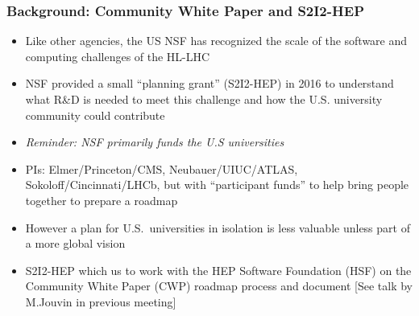 \begin{frame}
\frametitle{Background: Community White Paper and S2I2-HEP}

\begin{itemize}
\item Like other agencies, the US NSF has recognized the scale of the software and computing challenges of the HL-LHC
\item NSF provided a small ``planning grant'' (S2I2-HEP) in 2016 to understand what R\&D is needed to meet this challenge and how the U.S. university community could contribute
\item {\it Reminder: NSF primarily funds the U.S universities}
\item PIs: Elmer/Princeton/CMS, Neubauer/UIUC/ATLAS, Sokoloff/Cincinnati/LHCb, but with ``participant funds'' to help bring people together to prepare a roadmap
\item However a plan for U.S.\ universities in isolation is less valuable unless part of a more global vision
\item S2I2-HEP which us to work with the HEP Software Foundation (HSF) on the Community White Paper (CWP) roadmap process and document [See talk by M.Jouvin in previous meeting]
\end{itemize}

\end{frame}


